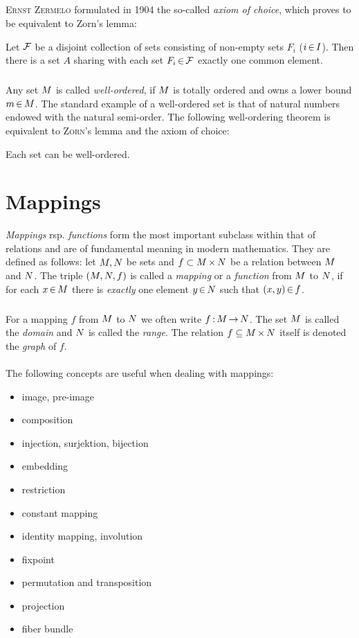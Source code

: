 \documentclass[11pt,twoside]{article}
\begin{document}
\subparagraph{}
\textsc{Ernst Zermelo} formulated in 1904
the so-called \textit{axiom of choice},
which proves to be equivalent to Zorn's lemma:

\begin{theorem}
Let $\cal{F}$ be a disjoint collection of sets
consisting of non-empty sets $F_i$ ($i \xeof I$).
Then there is a set $A$
sharing with each set $F_i \xeof \cal{F}$ exactly one common element.
\end{theorem}

\subparagraph{}
Any set $\setM$ is called \textit{well-ordered},
if $\setM$ is totally ordered and owns a lower bound $m \xeof \setM$.
The standard example of a well-ordered set is that of natural numbers
endowed with the natural semi-order.
The following well-ordering theorem is equivalent
to \textsc{Zorn}'s lemma and the axiom of choice:

\begin{theorem}
Each set can be well-ordered.
\end{theorem}

\section{Mappings}
\textit{Mappings} rsp. \textit{functions} form the most important subclass
within that of relations and are of fundamental meaning in modern mathematics.
They are defined as follows:
let $\setM, \setN$ be sets and
$f \subset \cross{\setM}{\setN}$ be a relation between $\setM$ and $\setN$.
The triple $(\setM,\setN,f)$ is called a \textit{mapping} or a \textit{function}
from $\setM$ to $\setN$,
if for each $x \xeof \setM$ there is \textit{exactly} one element $y \xeof \setN$
such that $(x,y) \xeof f$.

\subparagraph{}
For a mapping $f$ from $\setM$ to $\setN$ we often write $f \: \setM \xto \setN$.
The set $\setM$ is called the \textit{domain}
and $\setN$ is called the \textit{range}.
The relation $f \subseteq \cross{\setM}{\setN}$ itself is denoted
the \textit{graph} of $f$.

\paragraph{}
The following concepts are useful when dealing with mappings:

\begin{itemize}[leftmargin=12mm]
\item image, pre-image
\item composition
\item injection, surjektion, bijection 
\item embedding
\item restriction
\item constant mapping
\item identity mapping, involution
\item fixpoint
\item permutation and transposition
\item projection 
\item fiber bundle
\end{itemize}
\end{document}
